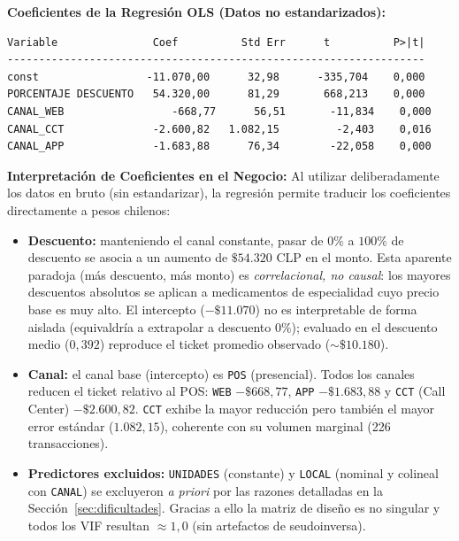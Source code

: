 \documentclass[12pt,letterpaper]{article}
\begin{document}
\vspace{0.4cm}
\noindent\textbf{Coeficientes de la Regresión OLS (Datos no estandarizados):}
\begin{verbatim}
Variable               Coef          Std Err      t          P>|t|
------------------------------------------------------------------
const                 -11.070,00      32,98      -335,704    0,000
PORCENTAJE DESCUENTO   54.320,00      81,29       668,213    0,000
CANAL_WEB                 -668,77      56,51       -11,834    0,000
CANAL_CCT              -2.600,82   1.082,15         -2,403    0,016
CANAL_APP              -1.683,88      76,34        -22,058    0,000
\end{verbatim}
\vspace{0.4cm}

\textbf{Interpretación de Coeficientes en el Negocio:}
Al utilizar deliberadamente los datos en bruto (sin estandarizar), la regresión permite traducir los coeficientes directamente a pesos chilenos:
\begin{itemize}
    \item \textbf{Descuento:} manteniendo el canal constante, pasar de $0\%$ a $100\%$ de descuento se asocia a un aumento de $\$54.320$ CLP en el monto. Esta aparente paradoja (más descuento, más monto) es \textit{correlacional, no causal}: los mayores descuentos absolutos se aplican a medicamentos de especialidad cuyo precio base es muy alto. El intercepto ($-\$11.070$) no es interpretable de forma aislada (equivaldría a extrapolar a descuento $0\%$); evaluado en el descuento medio ($0,392$) reproduce el ticket promedio observado ($\sim\$10.180$).
    \item \textbf{Canal:} el canal base (intercepto) es \texttt{POS} (presencial). Todos los canales reducen el ticket relativo al POS: \texttt{WEB} $-\$668,77$, \texttt{APP} $-\$1.683,88$ y \texttt{CCT} (Call Center) $-\$2.600,82$. \texttt{CCT} exhibe la mayor reducción pero también el mayor error estándar ($1.082,15$), coherente con su volumen marginal (226 transacciones).
    \item \textbf{Predictores excluidos:} \texttt{UNIDADES} (constante) y \texttt{LOCAL} (nominal y colineal con \texttt{CANAL}) se excluyeron \textit{a priori} por las razones detalladas en la Sección~\ref{sec:dificultades}. Gracias a ello la matriz de diseño es no singular y todos los VIF resultan $\approx 1{,}0$ (sin artefactos de seudoinversa).
\end{itemize}
\end{document}
